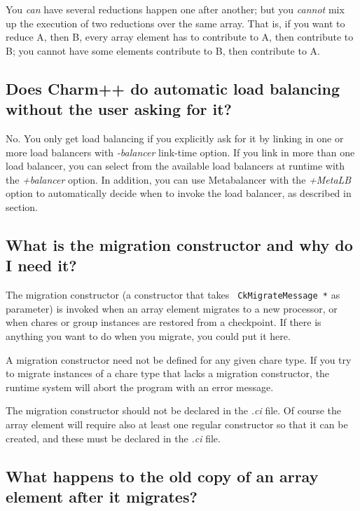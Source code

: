You {\em can} have several reductions happen one after another; but
you {\em cannot} mix up the execution of two reductions over the same
array. That is, if you want to reduce A, then B, every array element has
to contribute to A, then contribute to B; you cannot have some elements
contribute to B, then contribute to A.

\subsection{Does Charm++ do automatic load balancing without the user asking
for it?}

No. You only get load balancing if you explicitly ask for it by
linking in one or more load balancers with {\em -balancer} link-time
option. If you link in more than one load balancer, you can select
from the available load balancers at runtime with the {\em +balancer}
option. In addition, you can use Metabalancer with the {\em +MetaLB} option to
automatically decide when to invoke the load balancer, as described in
section.

\subsection{What is the migration constructor and why do I need it?}

The migration constructor (a constructor that takes {\tt
  CkMigrateMessage *} as parameter) is invoked when an array element
migrates to a new processor, or when chares or group instances are
restored from a checkpoint. If there is anything you want to do when
you migrate, you could put it here.

A migration constructor need not be defined for any given chare
type. If you try to migrate instances of a chare type that lacks a
migration constructor, the runtime system will abort the program with
an error message.

The migration constructor should not be declared in the {\em .ci} file. Of
course the array element will require also at least one regular constructor so
that it can be created, and these must be declared in the {\em .ci} file.

\subsection{What happens to the old copy of an array element after it migrates?}

